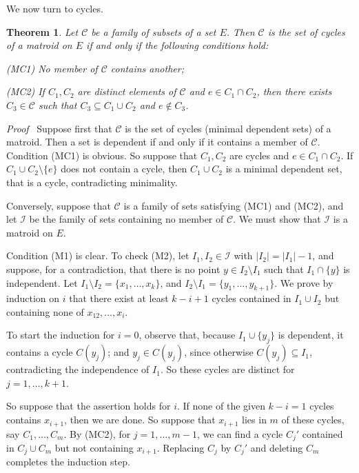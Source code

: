 \documentclass[12pt]{article}
\newtheorem{theorem}{Theorem}[section]
\newcommand{\head}[1]{\medbreak\noindent\textit{#1}\ }
\begin{document}
\medbreak

We now turn to cycles.

\begin{theorem}
Let $\mathcal{C}$ be a family of subsets of a set $E$. Then
$\mathcal{C}$ is the set of cycles of a matroid on $E$ if and
only if the following conditions hold:
\begin{description}
\item{(MC1)} No member of $\mathcal{C}$ contains another;
\item{(MC2)} If $C_1,C_2$ are distinct elements of $\mathcal{C}$
and $e\in C_1\cap C_2$, then there exists $C_3\in\mathcal{C}$ such
that $C_3\subseteq C_1\cup C_2$ and $e\notin C_3$.
\end{description}
\end{theorem}

\head{Proof} Suppose first that $\mathcal{C}$ is the set of
cycles (minimal dependent sets) of a matroid. Then a set is
dependent if and only if it contains a member of $\mathcal{C}$.
Condition (MC1) is obvious. So suppose that $C_1,C_2$ are cycles
and $e\in C_1\cap C_2$. If $C_1\cup C_2\setminus\{e\}$ does not
contain a cycle, then $C_1\cup C_2$ is a minimal dependent set,
that is a cycle, contradicting minimality.

Conversely, suppose that $\mathcal{C}$ is a family of sets
satisfying (MC1) and (MC2), and let $\mathcal{I}$ be the family
of sets containing no member of $\mathcal{C}$. We must show that
$\mathcal{I}$ is a matroid on $E$.

Condition (M1) is clear. To check (M2),
let $I_1,I_2\in\mathcal{I}$ with $|I_2|=|I_1|-1$, and suppose,
for a contradiction, that there is no point $y\in I_2\setminus I_1$
such that $I_1\cap\{y\}$ is independent. Let $I_1\setminus I_2=
\{x_1, \ldots, x_k\}$, and $I_2\setminus I_1=\{y_1, \ldots,y_{k+1}\}$.
We prove by induction on $i$ that there exist at least $k-i+1$
cycles contained in $I_1\cup I_2$ but containing none of
$x_12, \ldots, x_i$.

To start the induction for $i=0$, observe that, because
$I_1\cup\{y_j\}$ is dependent, it contains a cycle $C(y_j)$; and
$y_j\in C(y_j)$, since otherwise $C(y_j)\subseteq I_1$,
contradicting the independence of $I_1$. So these cycles are
distinct for $j=1, \ldots, k+1$.

So suppose that the assertion holds for $i$. If none of the given
$k-i=1$ cycles contains $x_{i+1}$, then we are done. So suppose
that $x_{i+1}$ lies in $m$ of these cycles, say $C_1,\ldots,C_m$.
By (MC2), for $j=1, \ldots, m-1$, we can find a cycle $C_j'$
contained in $C_j\cup C_m$ but not containing $x_{i+1}$. Replacing
$C_j$ by $C_j'$ and deleting $C_m$ completes the induction step.
\end{document}
